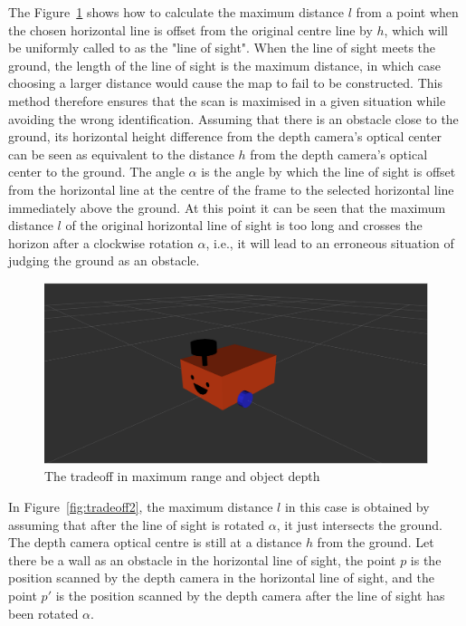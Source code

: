 The Figure~\ref{fig:tradeoff} shows how to calculate the maximum distance $l$ from a point when the chosen horizontal line is offset from the original centre line by $h$, 
which will be uniformly called to as the "line of sight". 
When the line of sight meets the ground, the length of the line of sight is the maximum distance, 
in which case choosing a larger distance would cause the map to fail to be constructed. 
This method therefore ensures that the scan is maximised in a given situation while avoiding the wrong identification. 
Assuming that there is an obstacle close to the ground, 
its horizontal height difference from the depth camera's optical center can be seen as equivalent to the distance $h$ from the depth camera's optical center to the ground.
The angle $\alpha$ is the angle by which the line of sight is offset from the horizontal line at the centre of the frame to the selected horizontal line immediately above the ground. 
At this point it can be seen that the maximum distance $l$ of the original horizontal line of sight is too long and crosses the horizon after a clockwise rotation $\alpha$,
i.e., it will lead to an erroneous situation of judging the ground as an obstacle.

\begin{figure}[H]
    \centering
    \includegraphics[width=0.8\linewidth]{figs/robot.png}
    \caption{The tradeoff in maximum range and object depth}
    \label{fig:tradeoff}
\end{figure}

In Figure~\ref{fig:tradeoff2}, the maximum distance $l$ in this case is obtained by assuming that after the line of sight is rotated $\alpha$, 
it just intersects the ground. The depth camera optical centre is still at a distance $h$ from the ground. 
Let there be a wall as an obstacle in the horizontal line of sight, the point $p$ is the position 
scanned by the depth camera in the horizontal line of sight, and the point $p'$ is the position 
scanned by the depth camera after the line of sight has been rotated $\alpha$.

